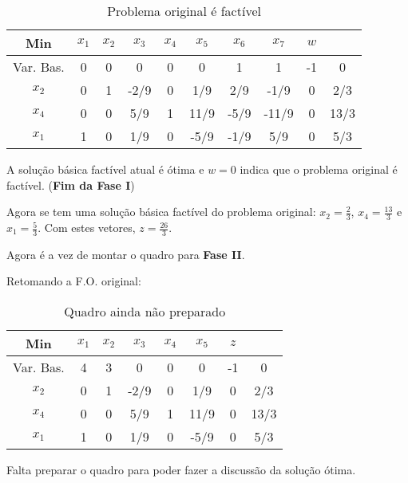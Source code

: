 \begin{table}[!h]
\centering
\caption{Problema original é factível}
\begin{tabular}{|c|cccccccc|c|}
  \hline
  Min         & $x_1$ & $x_2$ & $x_3$ & $x_4$ & $x_5$ & $x_6$ & $x_7$ & $w$ &    \\
  \hline
  Var. Bas.   &   0   &   0 &   0 &   0 &   0 &   1 &   1 &  -1 &  0 \\
  \hline
  $x_2$       &   0   &   1 &  -2/9 &   0 &    1/9 &    2/9 &   -1/9 &   0 &  2/3 \\
  $x_4$       &   0   &   0 &   5/9 &   1 &   11/9 &   -5/9 &  -11/9 &   0 & 13/3 \\
  $x_1$       &   1   &   0 &   1/9 &   0 &   -5/9 &   -1/9 &    5/9 &   0 &  5/3 \\
  \hline
\end{tabular}
\end{table}

A solução básica factível atual é ótima e $ w = 0 $ indica que o problema 
original é factível. \hfill (\textbf{Fim da Fase I})

Agora se tem uma solução básica factível do problema original: $ x_2 = \frac{2}{3} $,
$ x_4 = \frac{13}{3} $ e $ x_1 = \frac{5}{3} $.
Com estes vetores, $ z = \frac{26}{3} $.

Agora é a vez de montar o quadro para \textbf{Fase II}.

Retomando a F.O. original: \newpage

\begin{table}[!h]
\centering
\caption{Quadro ainda não preparado}
\begin{tabular}{|c|cccccc|c|}
  \hline
  Min         & $x_1$ & $x_2$ & $x_3$ & $x_4$ & $x_5$ & $z$  &      \\
  \hline
  Var. Bas.   &  4    &   3   &     0 &   0   &     0 &  -1  & 0    \\
  \hline
  $x_2$       &  0    &   1   &  -2/9 &   0   &   1/9 &   0  & 2/3  \\
  $x_4$       &  0    &   0   &   5/9 &   1   &  11/9 &   0  & 13/3 \\
  $x_1$       &  1    &   0   &   1/9 &   0   &  -5/9 &   0  & 5/3  \\
  \hline
\end{tabular}
\end{table}

Falta preparar o quadro para poder fazer a discussão da solução ótima.

